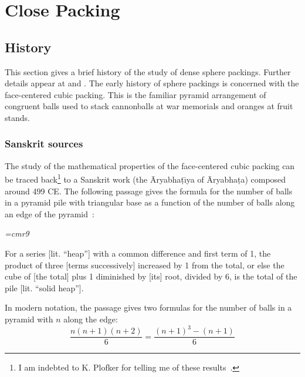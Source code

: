 

\chapter{Close Packing}

\section{History}

This section gives a brief history of the study of dense sphere
packings.  Further details appear at \cite{unkwown} and
\cite{unknown}.  %
The early history of sphere packings is concerned with the
face-centered cubic packing.  This is the familiar pyramid arrangement
of congruent balls used to stack cannonballs at war memorials and
oranges at fruit stands.

\subsection{Sanskrit sources}



The study of the mathematical properties of the face-centered cubic
packing can be traced back\footnote{I am indebted to K. Plofker for
telling me of these results~\cite{Plo00}.} to a Sanskrit work (the \=Aryabha\d t\={\i}ya
 of \=Aryabha\d ta) composed around 499 CE.  The following passage gives
the formula for the number of balls in a pyramid pile with triangular base as
a function of the number of balls along an edge of the pyramid~\cite{Ary}:


\bigskip

{\narrower\it\font\ninerm=cmr9

For a series [lit. ``heap''] with a common difference and
  first term of 1, the product of three [terms successively] increased
  by 1 from the total, or else the cube of [the total] plus 1
  diminished by [its] root, divided by 6, is the total of the pile
  [lit. ``solid heap''].  

}

\bigskip

 In modern notation, the passage gives two formulas for the number of
 balls in a pyramid with $n$ along the edge:
\[
\dfrac{n(n+1)(n+2)}{6} =  \dfrac{(n+1)^3 - (n+1)}{6}
\]

